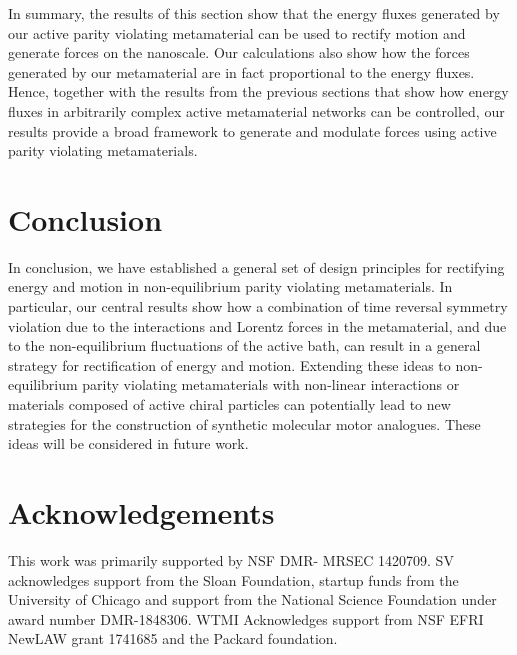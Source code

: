 \documentclass[
 preprint,
 preprintnumbers,
 amsmath,amssymb,
 aps,
 pre,
 longbibliography,
 superscriptaddress,
 10pt, twocolumn
]{revtex4-1}
\begin{document}
In summary, the results of this section show that the energy fluxes generated by our active parity violating metamaterial can be used to rectify motion and generate forces on the nanoscale. Our calculations also show how the forces generated by our metamaterial are in fact proportional to the energy fluxes. Hence, together with the results from the previous sections that show how energy fluxes in arbitrarily complex active metamaterial networks can be controlled, our results provide a broad framework to generate and modulate forces using active parity violating metamaterials.  


\section{Conclusion} \label{sec:conclusion}

In conclusion, we have established a general set of design principles for rectifying energy and motion in non-equilibrium parity violating metamaterials. In particular, our central results show how a combination of time reversal symmetry violation due to the interactions and Lorentz forces in the metamaterial, and due to the non-equilibrium fluctuations of the active bath, can result in a general strategy for rectification of energy and motion. Extending these ideas to non-equilibrium parity violating metamaterials with non-linear interactions or materials composed of active chiral particles can potentially lead to new strategies for the construction of synthetic molecular motor analogues. These ideas will be considered in future work. 



\section*{Acknowledgements}
This work was primarily supported by NSF DMR- MRSEC 1420709. SV acknowledges support from the Sloan Foundation, startup funds from the University of Chicago and support from the National Science Foundation under award number DMR-1848306. WTMI Acknowledges support from NSF EFRI NewLAW grant 1741685 and the Packard foundation. 


\end{document}
